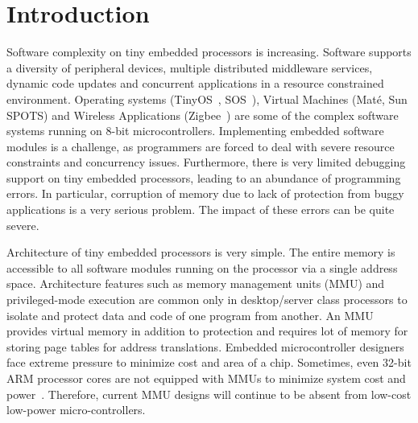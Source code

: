 \section{Introduction}
\label{sec:intro}
%
Software complexity on tiny embedded processors is increasing.
%
Software supports a diversity of peripheral devices, multiple distributed middleware services, dynamic code updates and concurrent applications in a resource constrained environment.
%
Operating systems (TinyOS~\cite{levis05t2}, SOS~\cite{ram05sos}), Virtual Machines (Mat\'e, Sun SPOTS) and Wireless Applications (Zigbee~\cite{zigbee}) are some of the complex software systems running on 8-bit microcontrollers.
%
Implementing embedded software modules is a challenge, as programmers are forced to deal with severe resource constraints and concurrency issues.
%
Furthermore, there is very limited debugging support on tiny embedded processors, leading to an abundance of programming errors.
%
In particular, corruption of memory due to lack of protection from buggy applications is a very serious problem.
%
The impact of these errors can be quite severe.
%



%
Architecture of tiny embedded processors is very simple.
%
The entire memory is accessible to all software modules running on the processor via a single address space.
%
Architecture features such as memory management units (MMU) and privileged-mode execution are common only in desktop/server class processors to isolate and protect data and code of one program from another.
%
An MMU provides virtual memory in addition to protection and requires lot of memory for storing page tables for address translations.
%
Embedded microcontroller designers face extreme pressure to minimize cost and area of a chip.
%
Sometimes, even 32-bit ARM processor cores are not equipped with MMUs to minimize system cost and power~\cite{arm7tdmi}.
%
Therefore, current MMU designs will continue to be absent from low-cost low-power micro-controllers.
%


